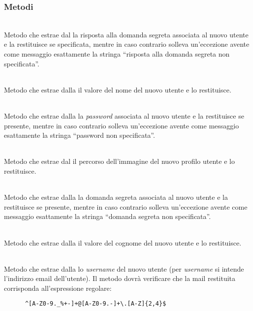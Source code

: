 \subsubsection*{Metodi}
\begin{description}

	\item{}\\
	Metodo che estrae dal  la risposta alla domanda segreta associata al nuovo utente e la restituisce se specificata, mentre in caso contrario solleva un'eccezione avente come messaggio esattamente la stringa ``risposta alla domanda segreta non specificata''.
	
	\item{}\\
	Metodo che estrae dalla  il valore del nome del nuovo utente e lo restituisce.
	
		\item{}\\
	Metodo che estrae dalla  la \textit{password} associata al nuovo utente e la restituisce se presente, mentre in caso contrario solleva un'eccezione avente come messaggio esattamente la stringa ``password non specificata''.
	
		\item{}\\
	Metodo che estrae dal  il percorso dell'immagine del nuovo profilo utente e lo restituisce.
	
		\item{}\\
	Metodo che estrae dalla  la domanda segreta associata al nuovo utente e la restituisce se presente, mentre in caso contrario solleva un'eccezione avente come messaggio esattamente la stringa ``domanda segreta non specificata''.

	\item{}\\
	Metodo che estrae dalla  il valore del cognome del nuovo utente e lo restituisce.
	

	\item{}\\
	Metodo che estrae dalla  lo \textit{username} del nuovo utente (per \textit{username} si intende l'indirizzo email dell'utente). Il metodo dovrà verificare che la mail restituita corrisponda all'espressione regolare:
\begin{verbatim}
	  ^[A-Z0-9._%+-]+@[A-Z0-9.-]+\.[A-Z]{2,4}$
\end{verbatim}
	

\end{description}
